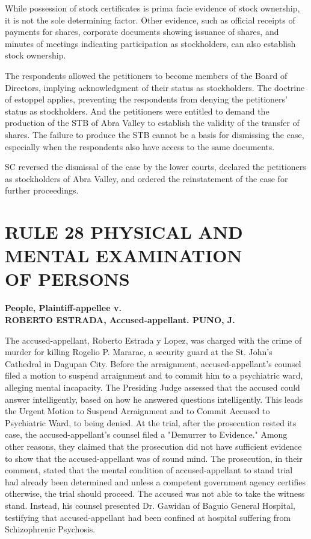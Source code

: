 \documentclass[
12pt,
oneside,
onehalfspacing,
headsepline
]{DigestCollection}
\begin{document}
While possession of stock certificates is prima facie evidence of stock ownership, it is not the sole determining factor. Other evidence, such as official receipts of payments for shares, corporate documents showing issuance of shares, and minutes of meetings indicating participation as stockholders, can also establish stock ownership.

The respondents allowed the petitioners to become members of the Board of Directors, implying acknowledgment of their status as stockholders. The doctrine of estoppel applies, preventing the respondents from denying the petitioners' status as stockholders. And the petitioners were entitled to demand the production of the STB of Abra Valley to establish the validity of the transfer of shares. The failure to produce the STB cannot be a basis for dismissing the case, especially when the respondents also have access to the same documents. 

SC reversed the dismissal of the case by the lower courts, declared the petitioners as stockholders of Abra Valley, and ordered the reinstatement of the case for further proceedings.

\chapter{RULE 28 PHYSICAL AND MENTAL EXAMINATION\\ OF PERSONS}
\label{5ffd2a80-0a16-11ef-932c-63c852f65e48}


\label{319868e0-0a2e-11ef-a1a5-03b0bde1fccf}


\noindent\textbf{People, Plaintiff-appellee v. \\ROBERTO ESTRADA, Accused-appellant. PUNO, J.}\vspace{0.4cm}

The accused-appellant, Roberto Estrada y Lopez, was charged with the crime of murder for killing Rogelio P. Mararac, a security guard at the St. John's Cathedral in Dagupan City. Before the arraignment, accused-appellant's counsel filed a motion to suspend arraignment and to commit him to a psychiatric ward, alleging mental incapacity. The Presiding Judge assessed that the accused could answer intelligently, based on how he answered questions intelligently. This leads the Urgent Motion to Suspend Arraignment and to Commit Accused to Psychiatric Ward, to being denied. At the trial, after the prosecution rested its case, the accused-appellant's counsel filed a "Demurrer to Evidence." Among other reasons, they claimed that the prosecution did not have sufficient evidence to show that the accused-appellant was of sound mind. The prosecution, in their comment, stated that the mental condition of accused-appellant to stand trial had already been determined and unless a competent government agency certifies otherwise, the trial should proceed. The accused was not able to take the witness stand. Instead, his counsel presented Dr. Gawidan of Baguio General Hospital, testifying that accused-appellant had been confined at hospital suffering from Schizophrenic Psychosis. 
\end{document}

